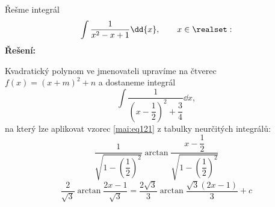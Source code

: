 \begin{mdframed}[style=mdexam]
  \begin{example}\label{MAI:exam120}
    Řešme integrál 
    \begin{equation*}
      \int\frac{1}{x^2 - x + 1}\dd{x}, \qquad x\in\realset:
    \end{equation*}
    \noindent\textbf{Řešení:}

    Kvadratický polynom ve jmenovateli upravíme na čtverec \(f(x) = (x + m)^2 + n\) a dostaneme
    integrál
    \begin{equation*}
      \int\dfrac{1}{\left(x-\dfrac{1}{2}\right)^2+\dfrac{3}{4}}\dd{x},
    \end{equation*}
    na který lze aplikovat vzorec \ref{mai:eq121} z tabulky neurčitých integrálů: 
    \begin{equation*}
      \dfrac{1}{\sqrt{1-\left(\dfrac{1}{2}\right)^2}}\arctan
      \dfrac{x-\dfrac{1}{2}}{\sqrt{1-\left(\dfrac{1}{2}\right)^2}} 
    \end{equation*}
    \begin{equation*}
      \dfrac{2}{\sqrt{3}}\arctan\dfrac{2x-1}{\sqrt{3}}  =
      \dfrac{2\sqrt{3}}{3}\arctan\dfrac{\sqrt{3}(2x-1)}{3} + c
    \end{equation*}
  \end{example}
\end{mdframed}